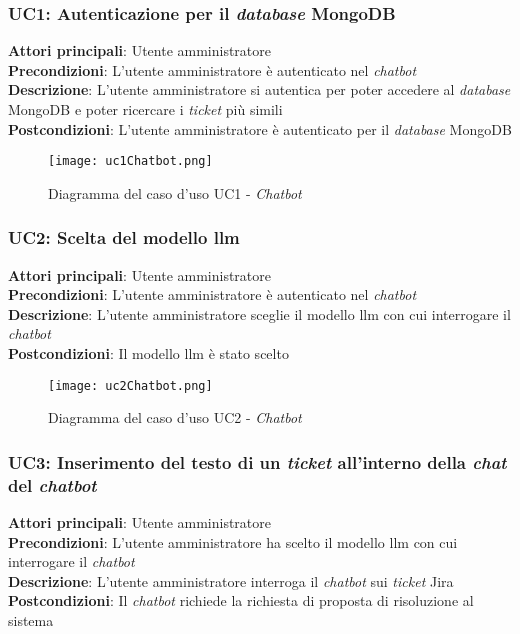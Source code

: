 \subsubsection{UC1: Autenticazione per il \textit{database} MongoDB}
\textbf{Attori principali}: Utente amministratore \\
\textbf{Precondizioni}: L'utente amministratore è autenticato nel \textit{chatbot} \\
\textbf{Descrizione}: L'utente amministratore si autentica per poter accedere al \textit{database} MongoDB e poter ricercare i \textit{ticket} più simili \\
\textbf{Postcondizioni}: L'utente amministratore è autenticato per il \textit{database} MongoDB \\
\begin{figure}[H]
    \centering
    \texttt{[image: uc1Chatbot.png]}
    \caption{Diagramma del caso d'uso UC1 - \textit{Chatbot}}
    \label{fig:UC1Chatbot}
\end{figure}


\subsubsection{UC2: Scelta del modello \gls{llm}}
\textbf{Attori principali}: Utente amministratore \\
\textbf{Precondizioni}: L'utente amministratore è autenticato nel \textit{chatbot} \\
\textbf{Descrizione}: L'utente amministratore sceglie il modello \gls{llm} con cui interrogare il \textit{chatbot} \\
\textbf{Postcondizioni}: Il modello \gls{llm} è stato scelto \\
\begin{figure}[H]
    \centering
    \texttt{[image: uc2Chatbot.png]}
    \caption{Diagramma del caso d'uso UC2 - \textit{Chatbot}}
    \label{fig:UC2Chatbot}
\end{figure}


\subsubsection{UC3: Inserimento del testo di un \textit{ticket} all'interno della \textit{chat} del \textit{chatbot}}
\textbf{Attori principali}: Utente amministratore \\
\textbf{Precondizioni}: L'utente amministratore ha scelto il modello \gls{llm} con cui interrogare il \textit{chatbot} \\
\textbf{Descrizione}: L'utente amministratore interroga il \textit{chatbot} sui \textit{ticket} Jira \\
\textbf{Postcondizioni}: Il \textit{chatbot} richiede la richiesta di proposta di risoluzione al sistema \\

